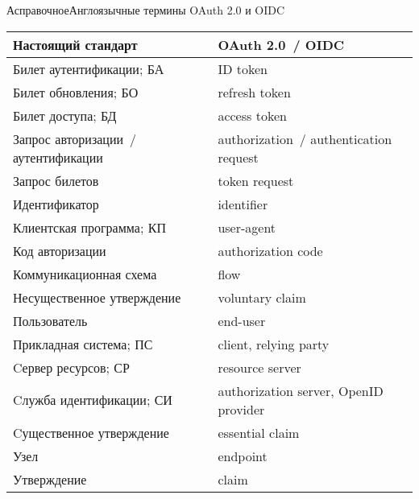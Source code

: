 \begin{appendix}{А}{справочное}{Англоязычные термины OAuth 2.0 и OIDC}
\label{ENG} 

\mbox{}

\begin{center}
\begin{tabular}{|p{8cm}|p{8cm}|}
\hline
Настоящий стандарт & OAuth 2.0~/ OIDC\\
\hline
\hline
Билет аутентификации; БА & ID token\\
Билет обновления; БО & refresh token\\
Билет доступа; БД & access token\\
Запрос авторизации~/ аутентификации & authorization~/ authentication request\\ 
Запрос билетов & token request\\
Идентификатор & identifier\\
Клиентская программа; КП & user-agent\\
Код авторизации & authorization code\\
Коммуникационная схема & flow\\
Несущественное утверждение & voluntary claim\\
Пользователь & end-user\\
Прикладная система; ПС & client, relying party\\
Cервер ресурсов; СР & resource server\\
Cлужба идентификации; СИ & authorization server, OpenID provider\\
Cущественное утверждение & essential claim\\
Узел & endpoint\\
Утверждение & claim\\
\hline
\end{tabular}
\end{center}

\end{appendix}